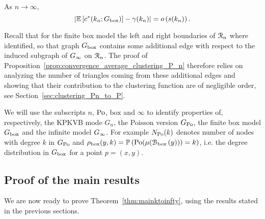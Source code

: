 \begin{proposition}\label{prop:convergence_average_clustering_P_n}
As $n \to \infty$,
\[
	\left|\mathbb{E}\left[c^\ast(k_n; G_{\mathrm{box}})\right] - \gamma(k_n)\right| = o\left(s(k_n)\right).
\]
\end{proposition}

Recall that for the finite box model the left and right boundaries of ${\mathcal R}_n$ where identified, so that graph $G_{\mathrm{box}}$ contains some additional edge with respect to the induced subgraph of $G_{\infty}$ on ${\mathcal R}_n$. The proof of Proposition~\ref{prop:convergence_average_clustering_P_n} therefore relies on analyzing the number of triangles coming from these additional edges and showing that their contribution to the clustering function are of negligible order, see Section~\ref{sec:clustering_Pn_to_P}. 

\begin{remark}
We will use the subscripts $n$, ${\mathrm{Po}}$, $\text{box}$ and $\infty$ to identify properties of, respectively, the KPKVB mode $G_n$, the Poisson version $G_{{\mathrm{Po}}}$, the finite box model $G_{\mathrm{box}}$ and the infinite model $G_{\infty}$. For example $N_{{\mathrm{Po}}}(k)$ denotes number of nodes with degree $k$ in $G_{{\mathrm{Po}}}$ and $\rho_{\text{box}}(y,k) = \mathbb{P}\left({\mathrm{Po}}(\mu({\mathcal B}_{\text{box}}\left(y\right))) = k\right)$, i.e. the degree distribution in $G_{\mathrm{box}}$ for a point $p = (x,y)$.
\end{remark}

\subsection{Proof of the main results}\label{ssec:proof_main_result_diverging_k}

We are now ready to prove Theorem~\ref{thm:mainktoinfty}, using the results stated in the previous sections.

